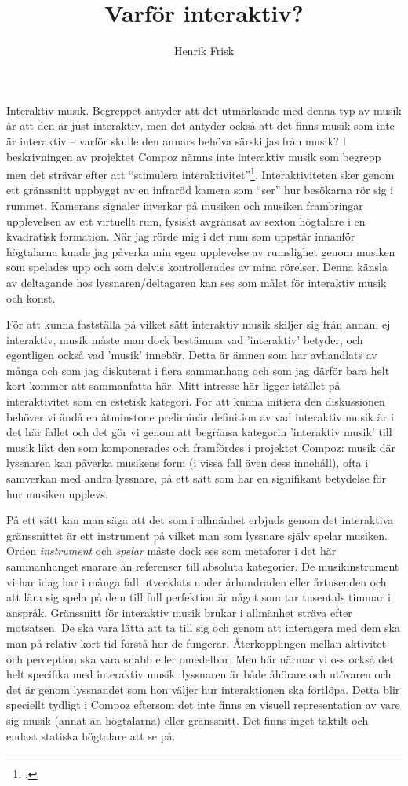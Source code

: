\documentclass[12pt]{article}
\author{Henrik Frisk}
\title{Varför interaktiv?}
\begin{document}
\maketitle

\noindent
Interaktiv musik. Begreppet antyder att det utmärkande med denna typ av musik är att den är just interaktiv, men det antyder också att det finns musik som inte är interaktiv -- varför skulle den annars behöva särskiljas från musik? I beskrivningen av projektet Compoz nämns inte interaktiv musik som begrepp men det strävar efter att ``stimulera interaktivitet''\footcite{compoz16}. Interaktiviteten sker genom ett gränssnitt uppbyggt av en infraröd kamera som ``ser'' hur besökarna rör sig i rummet. Kamerans signaler inverkar på musiken och musiken frambringar upplevelsen av ett virtuellt rum, fysiskt avgränsat av sexton högtalare i en kvadratisk formation. När jag rörde mig i det rum som uppstår innanför högtalarna kunde jag påverka min egen upplevelse av rumslighet genom musiken som spelades upp och som delvis kontrollerades av mina rörelser. Denna känsla av deltagande hos lyssnaren/deltagaren kan ses som målet för interaktiv musik och konst.

För att kunna fastställa på vilket sätt interaktiv musik skiljer sig från annan, ej interaktiv, musik måste man dock bestämma vad 'interaktiv' betyder, och egentligen också vad 'musik' innebär. Detta är ämnen som har avhandlats av många och som jag diskuterat i flera sammanhang och som jag därför bara helt kort kommer att sammanfatta här. Mitt intresse här ligger istället på interaktivitet som en estetisk kategori. För att kunna initiera den diskussionen behöver vi ändå en åtminstone preliminär definition av vad interaktiv musik är i det här fallet och det gör vi genom att begränsa kategorin 'interaktiv musik' till musik likt den som komponerades och framfördes i projektet Compoz: musik där lyssnaren kan påverka musikens form (i vissa fall även dess innehåll), ofta i samverkan med andra lyssnare, på ett sätt som har en signifikant betydelse för hur musiken upplevs.

På ett sätt kan man säga att det som i allmänhet erbjuds genom det interaktiva gränssnittet är ett instrument på vilket man som lyssnare själv spelar musiken. Orden \emph{instrument} och \emph{spelar} måste dock ses som metaforer i det här sammanhanget snarare än referenser till absoluta kategorier. De musikinstrument vi har idag har i många fall utvecklats under århundraden eller årtusenden och att lära sig spela på dem till full perfektion är något som tar tusentals timmar i anspråk. Gränssnitt för interaktiv musik brukar i allmänhet sträva efter motsatsen. De ska vara lätta att ta till sig och genom att interagera med dem ska man på relativ kort tid förstå hur de fungerar. Återkopplingen mellan aktivitet och perception ska vara snabb eller omedelbar. Men här närmar vi oss också det helt specifika med interaktiv musik: lyssnaren är både åhörare och utövaren och det är genom lyssnandet som hon väljer hur interaktionen ska fortlöpa. Detta blir speciellt tydligt i Compoz eftersom det inte finns en visuell representation av vare sig musik (annat än högtalarna) eller gränssnitt. Det finns inget taktilt och endast statiska högtalare att se på.
\end{document}
